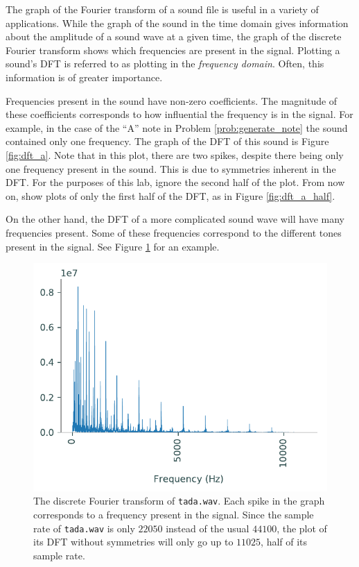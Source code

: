 The graph of the Fourier transform of a sound file is useful in a variety of applications.
While the graph of the sound in the time domain gives information about the amplitude of a sound wave at a given time, the graph of the discrete Fourier transform shows which frequencies are present in the signal.
Plotting a sound's DFT is referred to as plotting in the \emph{frequency domain}.
Often, this information is of greater importance.

Frequencies present in the sound have non-zero coefficients.
The magnitude of these coefficients corresponds to how influential the frequency is in the signal.
For example, in the case of the ``A'' note in Problem \ref{prob:generate_note} the sound contained only one frequency.
The graph of the DFT of this sound is Figure \ref{fig:dft_a}.
Note that in this plot, there are two spikes, despite there being only one frequency present in the sound.
This is due to symmetries inherent in the DFT.
For the purposes of this lab, ignore the second half of the plot.
From now on, show plots of only the first half of the DFT, as in Figure \ref{fig:dft_a_half}.

On the other hand, the DFT of a more complicated sound wave will have many frequencies present.
Some of these frequencies correspond to the different tones present in the signal.
See Figure \ref{fig:dft_tada} for an example.

\begin{center}
\begin{figure}
\includegraphics[scale=1.0]{figures/dft_tada.pdf}
\caption{The discrete Fourier transform of \texttt{tada.wav}.
Each spike in the graph corresponds to a frequency present in the signal.
Since the sample rate of \texttt{tada.wav} is only $22050$ instead of the usual $44100$, the plot of its DFT without symmetries will only go up to $11025$, half of its sample rate.} 
\label{fig:dft_tada}
\end{figure}
\end{center}

